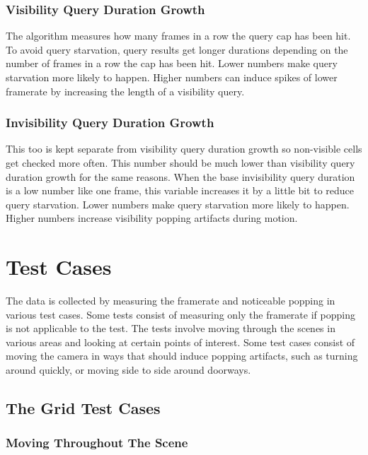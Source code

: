 \documentclass[12pt]{ucthesis}
\begin{document}
\subsubsection{Visibility Query Duration Growth}
\label{visibility-query-duration-growth}
The algorithm measures how many frames in a row the query cap has been hit.
To avoid query starvation, query results get longer durations depending on the number of frames in a row the cap has been hit.
Lower numbers make query starvation more likely to happen.
Higher numbers can induce spikes of lower framerate by increasing the length of a visibility query.

\subsubsection{Invisibility Query Duration Growth}
\label{invisibility-query-duration-growth}
This too is kept separate from visibility query duration growth so non-visible cells get checked more often.
This number should be much lower than visibility query duration growth for the same reasons.
When the base invisibility query duration is a low number like one frame, this variable increases it by a little bit to reduce query starvation.
Lower numbers make query starvation more likely to happen.
Higher numbers increase visibility popping artifacts during motion.

\section {Test Cases}
\label{test-cases}

The data is collected by measuring the framerate and noticeable popping in various test cases.
Some tests consist of measuring only the framerate if popping is not applicable to the test.
The tests involve moving through the scenes in various areas and looking at certain points of interest.
Some test cases consist of moving the camera in ways that should induce popping artifacts, such as turning around quickly, or moving side to side around doorways.

\subsection{The Grid Test Cases}
\label{the-grid-test-cases}

\subsubsection{Moving Throughout The Scene}
\label{grid-moving-throught-the-scene}
\end{document}

